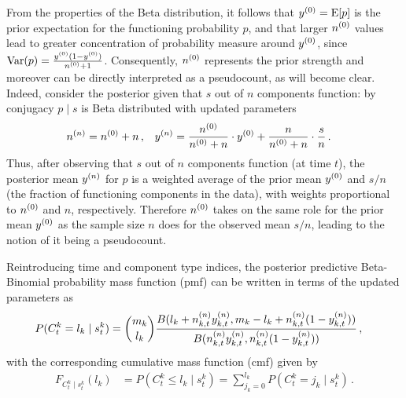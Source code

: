 \documentclass[12pt, a4paper]{elsarticle}
\newcommand{\bs}[1]{\boldsymbol{#1}}
\renewcommand{\vec}[1]{{\bs#1}}
\newcommand{\E}{\operatorname{E}}
\newcommand{\V}{\operatorname{Var}}
\begin{document}
From the properties of the Beta distribution,
it follows that $\yz = \E[p]$ is the prior expectation for the functioning probability $p$,
and that larger $n^{(0)}$ values lead to greater concentration of probability measure around $y^{(0)}$,
since $\V(p) = \frac{\yz (1-\yz)}{\nz + 1}$.
Consequently, $n^{(0)}$ represents the prior strength and moreover can be directly interpreted as a pseudocount, as will become clear.
Indeed, consider the posterior given that $s$ out of $n$ components function:
by conjugacy
$p \mid s$ is Beta distributed with updated parameters
\begin{align}
n^{(n)} &= n^{(0)} + n\,, &
y^{(n)} &= \frac{n^{(0)}}{n^{(0)} + n} \cdot y^{(0)} + \frac{n}{n^{(0)} + n} \cdot \frac{s}{n}\,.
\label{eq:nyupdate}
\end{align}
Thus, after observing that $s$ out of $n$ components function (at time $t$),
the posterior mean $y^{(n)}$ for $p$ is a weighted average of
the prior mean $y^{(0)}$ and $s/n$ (the fraction of functioning components in the data),
with weights proportional to $n^{(0)}$ and $n$, respectively.
Therefore $n^{(0)}$ takes on the same role for the prior mean $y^{(0)}$
as the sample size $n$ does for the observed mean $s/n$,
leading to the notion of it being a pseudocount.

Reintroducing time and component type indices, the posterior predictive Beta-Binomial probability mass function (pmf) can be written in terms of the updated parameters as
\begin{align}
P(C^k_t = l_k \mid s^k_t) &= {m_k \choose l_k} \frac{B(l_k + n^{(n)}_{k,t}y^{(n)}_{k,t}, m_k - l_k + n^{(n)}_{k,t}(1-y^{(n)}_{k,t}))}
                                                    {B(n^{(n)}_{k,t}y^{(n)}_{k,t}, n^{(n)}_{k,t}(1-y^{(n)}_{k,t}))} \,,
\label{eq:postpredCny}
\end{align}
with the corresponding cumulative mass function (cmf) given by
\begin{align}
F_{C^k_t\mid s^k_t}(l_k) &= P(C^k_t \le l_k \mid s^k_t) = \sum_{j_k=0}^{l_k} P(C^k_t = j_k \mid s^k_t)\,.
\label{eq:postpredCnycmf}
\end{align}
\end{document}
